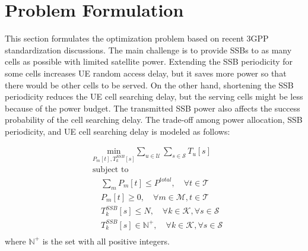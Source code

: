 
\section{Problem Formulation}
This section formulates the optimization problem based on recent 3GPP standardization discussions. The main challenge is to provide SSBs to as many cells as possible with limited satellite power. Extending the SSB periodicity for some cells increases UE random access delay, but it saves more power so that there would be other cells to be served. On the other hand, shortening the SSB periodicity reduces the UE cell searching delay, but the serving cells might be less because of the power budget. The transmitted SSB power also affects the success probability of the cell searching delay. The trade-off among power allocation, SSB periodicity, and UE cell searching delay is modeled as follows:

\begin{equation}
\begin{aligned}
    & \underset{P_m[t], T_k^{SSB}[s]}{\text{min}} \sum_{u \in \mathcal{U}} \sum_{s \in \mathcal{S}} T_u[s] \\
    & \text{subject to} \\
    & \quad \sum_{m} P_{m}[t] \leq P^{total}, \quad \forall t \in \mathcal{T} \\
    & \quad P_{m}[t] \geq 0, \quad \forall m \in \mathcal{M}, t \in \mathcal{T} \\
    & \quad T_k^{SSB}[s] \leq N, \quad \forall k \in \mathcal{K}, \forall s \in \mathcal{S} \\
    & \quad T_k^{SSB}[s] \in \mathbb{N}^+, \quad \forall k \in \mathcal{K}, \forall s \in \mathcal{S} \\
\end{aligned}
\end{equation}
where $\mathbb{N}^+$ is the set with all positive integers. 

